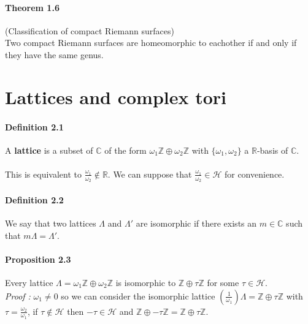 \documentclass[letterpaper,10pt]{article}
\begin{document}
\paragraph{Theorem 1.6} (Classification of compact Riemann surfaces) \\ 
Two compact Riemann surfaces are homeomorphic to eachother if and only if they have the same genus.


\section{Lattices and complex tori}%

\paragraph{Definition 2.1} A \textbf{lattice} is a subset of $\mathbb{C}$ of the form $\omega_1\mathbb{Z} \oplus \omega_2\mathbb{Z}$ with $\{\omega_1,\omega_2\}$ a 
$\mathbb{R}$-basis of $\mathbb{C}$. 
{\itshape \paragraph{} This is equivalent to  $\frac{\omega_1}{\omega_2} \notin \mathbb{R}$. We can suppose that $\frac{\omega_1}{\omega_2} \in \mathcal{H}$ for convenience.
}
\paragraph{Definition 2.2} We say that two lattices $\Lambda$ and $\Lambda'$ are isomorphic if there exists an $m\in \mathbb{C}$ such that 
$m\Lambda = \Lambda'$.

\paragraph{Proposition 2.3} Every lattice $\Lambda = \omega_1\mathbb{Z} \oplus \omega_2\mathbb{Z}$ is isomorphic to  $\mathbb{Z} \oplus \tau\mathbb{Z}$ 
for some $\tau \in \mathcal{H}$.\\

{\itshape Proof :} $\omega_1 \neq 0$ so we can consider the isomorphic lattice $(\frac{1}{\omega_1})\Lambda = \mathbb{Z} \oplus \tau\mathbb{Z}$ with 
$\tau = \frac{\omega_2}{\omega_1}$, if $\tau \notin \mathcal{H}$ then $-\tau \in \mathcal{H}$ and $\mathbb{Z} \oplus -\tau\mathbb{Z} = \mathbb{Z} \oplus \tau\mathbb{Z}$.
\end{document}
